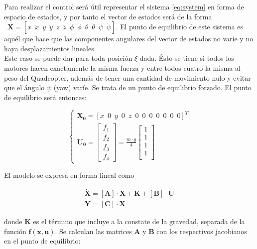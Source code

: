 \documentclass[twoside,11pt]{book}
\begin{document}
Para realizar el control será útil representar el sistema \ref{eq:system}  en forma de espacio de estados, y por tanto el vector de estados será de la forma $\enspace \pmb{X}=\left[ x \enspace \dot{x} \enspace y \enspace \dot{y} \enspace z \enspace \dot{z} \enspace \phi \enspace \dot{\phi} \enspace \theta \enspace \dot{\theta} \enspace \psi \enspace \dot{\psi} \right]$. El punto de equilibrio de este sistema es aquél que hace que las componentes angulares del vector de estados no varíe y no haya desplazamientos lineales. \\

Este caso se puede dar para toda posición $\xi$ dada. Ésto se tiene si todos los motores hacen exactamente la misma fuerza y entre todos cuatro la misma al peso del Quadcopter, además de tener una cantidad de movimiento nulo y evitar que el ángulo  $\psi$ (yaw) varíe. Se trata de un punto de equilibrio forzado. El punto de equilibrio será entonces:

\begin{equation}
\begin{cases}
\pmb{X_0}=\left[x \enspace 0 \enspace y \enspace 0 \enspace z \enspace 0 \enspace 0 \enspace 0 \enspace 0 \enspace 0 \enspace 0 \enspace 0 \right]^{T} \\
\pmb{U_0}=\left[ \begin{array}{l}
f_{1} \\
f_{2} \\
f_{3} \\
f_{4} \end{array} \right] = \frac{m \cdot g}{4} \left[ \begin{array}{l}
1 \\
1 \\
1 \\
1 \\ \end{array} \right]
\end{cases}
\end{equation}

El modelo se expresa en forma lineal como

\begin{equation}
\begin{array}{l}
\pmb{\dot{X}}=[\pmb{A}] \cdot \pmb{X} + \pmb{K} + [\pmb{B}] \cdot \pmb{U} \\
\pmb{Y} = [\pmb{C}] \cdot \pmb{X} 
\end{array}
\end{equation} 

donde $\pmb{K}$ es el término que incluye a la constate de la gravedad, separada de la función $\pmb{f(x,u)}$. Se calculan las matrices $\pmb{A}$ y $\pmb{B}$ con los respectivos jacobianos en el punto de equilibrio:
\end{document}
